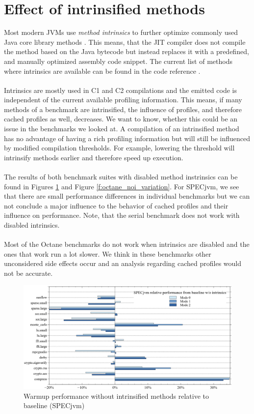 \section{Effect of intrinsified methods}
\label{s:perf_intrinsics}
Most modern JVMs use \textit{method intrinsics} to further optimize commonly used Java core library methods \cite{intrinsics_talk}.
This means, that the JIT compiler does not compile the method based on the Java bytecode but instead replaces it with a predefined, and manually optimized assembly code snippet. The current list of methods where intrinsics are available can be found in the code reference \cite{code_intrinsics}.
\\\\
Intrinsics are mostly used in C1 and C2 compilations and the emitted code is independent of the current available profiling information.
This means, if many methods of a benchmark are intrinsified, the influence of profiles, and therefore cached profiles as well, decreases.
We want to know, whether this could be an issue in the benchmarks we looked at. A compilation of an intrinsified method has no advantage of having a rich profiling information but will still be influenced by modified compilation thresholds. For example, lowering the threshold will intrinsify methods earlier and therefore speed up execution.
\\\\
The results of both benchmark suites with disabled method instrinsics can be found in Figures \ref{f:all_warmup_noi_variation} and Figure \ref{f:octane_noi_variation}.
For SPECjvm, we see that there are small performance differences in individual benchmarks but we can not conclude a major influence to the behavior of cached profiles and their influence on performance. Note, that the serial benchmark does not work with disabled intrinsics.
\\\\
Most of the Octane benchmarks do not work when intrinsics are disabled and the ones that work run a lot slower. We think in these benchmarks other unconsidered side effects occur and an analysis regarding cached profiles would not be accurate.
\begin{figure}[ht]
  \begin{center}
    \centering
    \includegraphics[width=1.0\textwidth]{figures/all_warmup_noi_variation.png}
    \caption{Warmup performance without intrinsified methods relative to baseline (SPECjvm)}
    \label{f:all_warmup_noi_variation}
  \end{center}
\end{figure}
